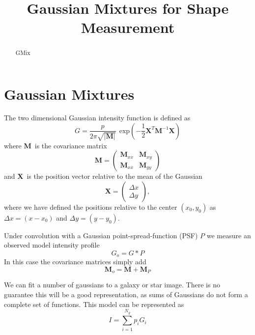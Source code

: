 \documentclass[10pt,preprint]{aastex}
\newcommand{\M}{\textbf{M}}
\newcommand{\X}{\textbf{X}}
\newcommand{\Dx}{\ensuremath{\Delta x}}
\newcommand{\Dy}{\ensuremath{\Delta y}}
\newcommand{\psf}{PSF}
\begin{document}
\fontsize{10pt}{1}
\selectfont


\title{Gaussian Mixtures for Shape Measurement}



\begin{abstract}

GMix

\end{abstract}

\section{Gaussian Mixtures} \label{sec:gmix}

The two dimensional Gaussian intensity function is defined as
\begin{equation}
G = \frac{p}{2 \pi \sqrt{|\M|} } ~~ \textrm{exp}\left( -\frac{1}{2} \X^T \M^{-1} \X \right)
\end{equation}
where \M\ is the covariance matrix
\begin{equation}
\M = \left( \begin{array}{cc}
\M_{xx} & \M_{xy} \\
\M_{xx} & \M_{yy} \end{array} \right)
\end{equation}
and \X\ is the position vector relative to the mean of the Gaussian
\begin{equation}
\X = \left( \begin{array}{c}
\Dx \\
\Dy \end{array} \right),
\end{equation}
where we have defined the positions relative to the center $(x_0,y_0)$
as $\Delta x=(x-x_0)$ and $\Delta y=(y-y_0)$.

Under convolution with a Gaussian point-spread-function (\psf) $P$ we measure an
observed model intensity profile
\begin{equation}
G_o = G * P
\end{equation}
In this case the covariance matrices simply add
\begin{equation}
\M_o = \M + \M_{P}
\end{equation}

We can fit a number of gaussians to a galaxy or star image.  There is 
no guarantee this will be a good representation, as sums of Gaussians
do not form a complete set of functions.   This model can be represented
as
\begin{equation}
I = \sum_{i=1}^{N_{g}} p_i G_i
\end{equation}
\end{document}
